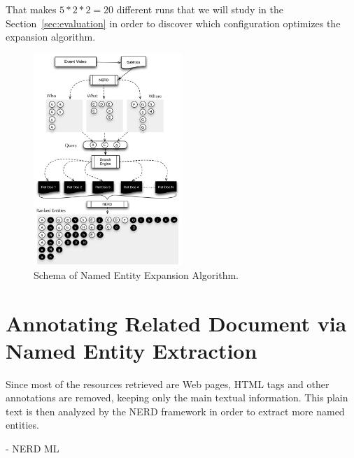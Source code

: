\documentclass{llncs}
\begin{document}
That makes $5 * 2 * 2 = 20$ different runs that we will study in the Section~\ref{sec:evaluation} in order to discover which configuration optimizes the expansion algorithm.

\begin{figure}[h!]
\centering
\includegraphics[width=0.5\textwidth]{figure/ExpansionDiagram}
\caption{Schema of Named Entity Expansion Algorithm.}
\label{fig:namedEntityExpansion}%
\end{figure}


\section{Annotating Related Document via Named Entity Extraction}
\label{sec:NEAnnotation}
Since most of the resources retrieved are Web pages, HTML tags and other annotations are removed, keeping only the main textual information. This plain text is then analyzed by the NERD framework in order to extract more named entities.

- NERD ML

\end{document}
